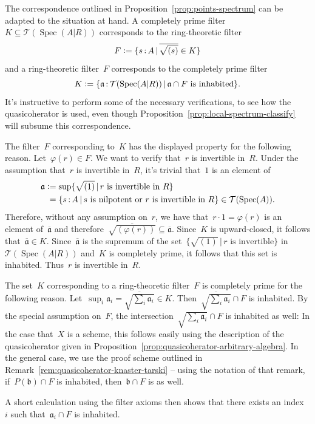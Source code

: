 \documentclass[10pt,reqno,a4paper]{amsbook}
\makeatletter
\theoremstyle{definition}
\theoremstyle{plain}
\theoremstyle{remark}
\newcommand{\T}{\mathcal{T}}
\newcommand{\aaa}{\mathfrak{a}}
\newcommand{\bbb}{\mathfrak{b}}
\DeclareMathOperator{\Spec}{Spec}
\newcommand{\Open}{\T}
\newcommand{\?}{\,{:}\,}
\renewcommand{\_}{\mathpunct{.}\,}
\newcommand{\defeq}{\vcentcolon=}
\renewenvironment{proof}[1][\proofname]{\par
  \pushQED{\qed}%
  \normalfont \topsep6\p@\@plus6\p@\relax
  \trivlist
  \item[\hskip\labelsep
        \itshape
    #1\@addpunct{.}]\ignorespaces
}{%
  \popQED\endtrivlist\@endpefalse
}
\makeatother
\begin{document}
\begin{proof}The correspondence outlined in
Proposition~\ref{prop:points-spectrum} can be adapted to the situation at hand.
A completely prime filter~$K \subseteq \Open(\Spec(A|R))$ corresponds to the
ring-theoretic filter
\[ F \defeq \{ s\?A \,|\, \overline{\sqrt{(s)}} \in K \} \]
and a ring-theoretic filter~$F$ corresponds to the completely prime filter
\[ K \defeq \{ \aaa\?\Open(\Spec(A|R)) \,|\, \text{$\aaa \cap F$ is inhabited} \}. \]
It's instructive to perform some of the necessary verifications, to see how
the quasicoherator is used, even though
Proposition~\ref{prop:local-spectrum-classify} will subsume this
correspondence.

The filter~$F$ corresponding to~$K$ has the displayed property for the
following reason. Let~$\varphi(r) \in F$. We want to verify that~$r$ is
invertible in~$R$. Under the assumption that~$r$ is invertible in~$R$,
it's trivial that~$1$ is an element of
\begin{align*}
  \aaa &\defeq \sup \{ \sqrt{(1)} \,|\, \text{$r$ is invertible in $R$} \} \\
  &\phantom{\vcentcolon}= \{ s\?A \,|\, \text{$s$ is nilpotent or $r$ is invertible in $R$} \}
  \in \Open(\Spec(A)).
\end{align*}
Therefore, without any assumption on~$r$, we have that~$r \cdot 1 = \varphi(r)$ is an
element of~$\overline{\aaa}$ and therefore~$\overline{\sqrt{(\varphi(r))}} \subseteq
\overline{\aaa}$. Since~$K$ is upward-closed, it follows that~$\overline{\aaa}
\in K$. Since~$\overline{\aaa}$ is the supremum of the set~$\{ \sqrt{(1)} \,|\,
\text{$r$ is invertible} \}$ in~$\Open(\Spec(A|R))$ and~$K$ is completely prime, it
follows that this set is inhabited. Thus~$r$ is invertible in~$R$.

The set~$K$ corresponding to a ring-theoretic filter~$F$ is completely prime
for the following reason. Let~$\sup_i \aaa_i = \overline{\sqrt{\sum_i \aaa_i}}
\in K$. Then~$\overline{\sqrt{\sum_i \aaa_i}} \cap F$ is inhabited. By the
special assumption on~$F$, the intersection~$\sqrt{\sum_i \aaa_i} \cap F$ is inhabited
as well: In the case that~$X$ is a scheme, this follows easily using the
description of the quasicoherator given in
Proposition~\ref{prop:quasicoherator-arbitrary-algebra}. In the general case,
we use the proof scheme outlined in
Remark~\ref{rem:quasicoherator-knaster-tarski} -- using the notation of that
remark, if~$P(\bbb) \cap F$ is inhabited, then~$\bbb \cap F$ is as well.

A short calculation using the filter axioms then shows that there
exists an index~$i$ such that~$\aaa_i \cap F$ is inhabited.
\end{proof}
\end{document}
